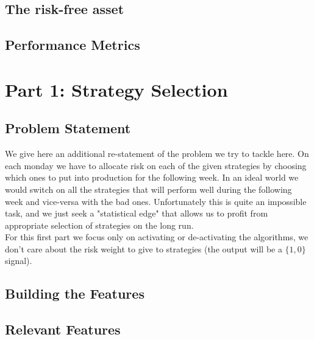 \documentclass[12pt]{article} %
\numberwithin{equation}{subsection}
\begin{document}



\subsection{The risk-free asset}




\subsection{Performance Metrics}






\section{Part 1: Strategy Selection}

\subsection{Problem Statement}

We give here an additional re-statement of the problem we try to tackle here. On each monday we have to allocate risk on each of the given strategies by choosing which ones to put into production for the following week. In an ideal world we would switch on all the strategies that will perform well during the following week and vice-versa with the bad ones. Unfortunately this is quite an impossible task, and we just seek a "statistical edge" that allows us to profit from appropriate selection of strategies on the long run.\\
For this first part we focus only on activating or de-activating the algorithms, we don't care about the risk weight to give to strategies (the output will be a $\{1,0\}$ signal).

\subsection{Building the Features}




\subsection{Relevant Features}
\end{document}
